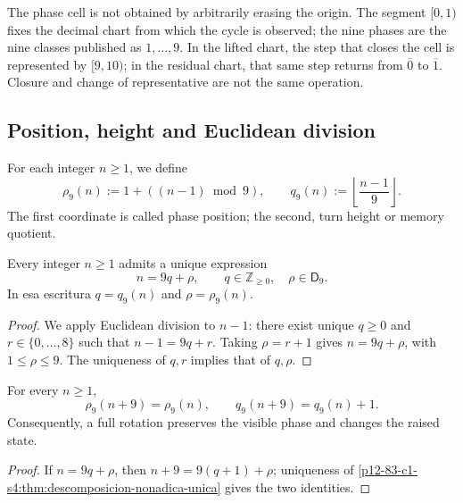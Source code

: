The phase cell is not obtained by arbitrarily erasing the origin. The segment
\([0,1)\) fixes the decimal chart from which the cycle is observed; the nine
phases are the nine classes published as \(1,\ldots,9\). In the lifted
chart, the step that closes the cell is represented by \([9,10)\); in the
residual chart, that same step returns from \(\overline0\) to \(\overline1\).
Closure and change of representative are not the same operation.

\subsection{Position, height and Euclidean division}

\begin{definition}
For each integer \(n\geq1\), we define
\[
 \rho_9(n):=1+((n-1)\bmod9),
 \qquad
 q_9(n):=\left\lfloor\frac{n-1}{9}\right\rfloor.
\]
The first coordinate is called phase position; the second, turn height or memory quotient.
\end{definition}

\begin{theorem}
\label{p12-83-c1-s4:thm:descomposicion-nonadica-unica}
Every integer \(n\geq1\) admits a unique expression
\[
 n=9q+\rho,
 \qquad q\in\mathbb Z_{\geq0},\quad \rho\in\mathsf D_9.
\]
In esa escritura \(q=q_9(n)\) and \(\rho=\rho_9(n)\).
\end{theorem}

\begin{proof}
We apply Euclidean division to \(n-1\): there exist unique
\(q\geq0\) and \(r\in\{0,\ldots,8\}\) such that
\(n-1=9q+r\). Taking \(\rho=r+1\) gives
\(n=9q+\rho\), with \(1\leq\rho\leq9\). The uniqueness of \(q,r\) implies that
of \(q,\rho\).
\end{proof}

\begin{corollary}
\label{p12-83-c1-s4:cor:retorno-fase-incremento-memoria}
For every \(n\geq1\),
\[
 \rho_9(n+9)=\rho_9(n),
 \qquad
 q_9(n+9)=q_9(n)+1.
\]
Consequently, a full rotation preserves the visible phase and changes the raised state.
\end{corollary}

\begin{proof}
If \(n=9q+\rho\), then \(n+9=9(q+1)+\rho\); uniqueness of
\cref{p12-83-c1-s4:thm:descomposicion-nonadica-unica} gives the two identities.
\end{proof}

